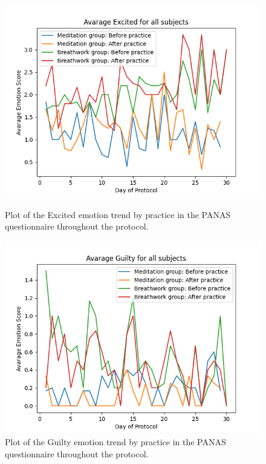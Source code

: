 \begin{figure}
    \centering
    \begin{minipage}{0.49\linewidth}
        \includegraphics[width=\linewidth]{Figures/panas/emotions/Excited.png}
        \caption{Plot of the Excited emotion trend by practice in the PANAS questionnaire throughout the protocol.}
        \label{fig:excited_by_practice}
    \end{minipage}
    \hfill %
    \begin{minipage}{0.49\linewidth}
        \includegraphics[width=\linewidth]{Figures/panas/emotions/Guilty.png}
        \caption{Plot of the Guilty emotion trend by practice in the PANAS questionnaire throughout the protocol.}
        \label{fig:guilty_by_practice}
    \end{minipage}
\end{figure} %

